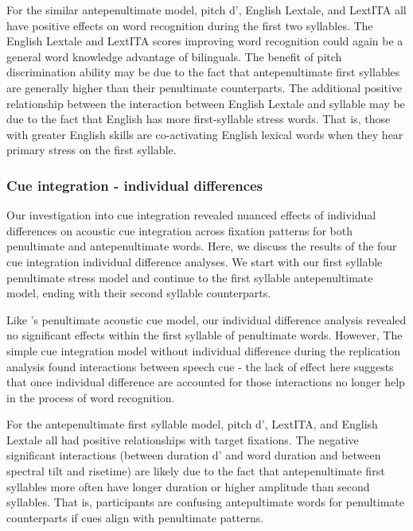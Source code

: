 For the similar antepenultimate model, pitch d', English Lextale, and LextITA all have positive effects on word recognition during the first two syllables. The English Lextale and LextITA scores improving word recognition could again be a general word knowledge advantage of bilinguals. The benefit of pitch discrimination ability may be due to the fact that antepenultimate first syllables are generally higher than their penultimate counterparts. The additional positive relationship between the interaction between English Lextale and syllable may be due to the fact that English has more first-syllable stress words. That is, those with greater English skills are co-activating English lexical words when they hear primary stress on the first syllable.

\subsubsection{Cue integration - individual differences}
Our investigation into cue integration revealed nuanced effects of individual differences on acoustic cue integration across fixation patterns for both penultimate and antepenultimate words. Here, we discuss the results of the four cue integration individual difference analyses. We start with our first syllable penultimate stress model and continue to the first syllable antepenultimate model, ending with their second syllable counterparts.

Like \cite{Sulpizio_McQueen_2012}'s penultimate acoustic cue model, our individual difference analysis revealed no significant effects within the first syllable of penultimate words. However, The simple cue integration model without individual difference during the replication analysis found interactions between speech cue - the lack of effect here suggests that once individual difference are accounted for those interactions no longer help in the process of word recognition. 

For the antepenultimate first syllable model, pitch d', LextITA, and English Lextale all had positive relationships with target fixations. The negative significant interactions (between duration d' and word duration and between spectral tilt and risetime) are likely due to the fact that antepenultimate first syllables more often have longer duration or higher amplitude than second syllables. That is, participants are confusing antepultimate words for penultimate counterparts if cues align with penultimate patterns.

